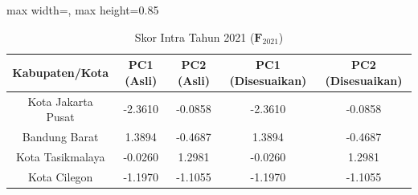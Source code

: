 \begin{table}[H]
\centering
\caption{Skor Intra Tahun 2021 ($\mathbf{F}_{2021}$)} \label{tab:sample1skor_intra_2021}
\begin{adjustbox}{max width=\textwidth, max height=0.85\textheight}
\begin{tabular}{|c|c|c|c|c|}
\hline
\textbf{Kabupaten/Kota} & \textbf{PC1 (Asli)} & \textbf{PC2 (Asli)} & \textbf{PC1 (Disesuaikan)} & \textbf{PC2 (Disesuaikan)} \\
\hline
Kota Jakarta Pusat & -2.3610 & -0.0858 & -2.3610 & -0.0858 \\
Bandung Barat & 1.3894 & -0.4687 & 1.3894 & -0.4687 \\
Kota Tasikmalaya & -0.0260 & 1.2981 & -0.0260 & 1.2981 \\
Kota Cilegon & -1.1970 & -1.1055 & -1.1970 & -1.1055 \\
\hline
\end{tabular}
\end{adjustbox}
\end{table}